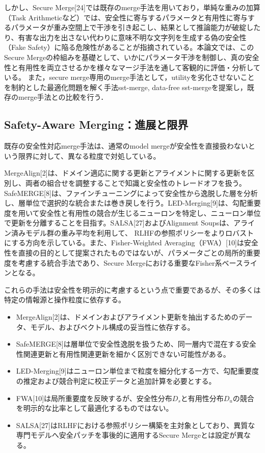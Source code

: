 しかし、Secure Merge[24]では既存のmerge手法を用いており，単純な重みの加算（Task Arithmeticなど）では、安全性に寄与するパラメータと有用性に寄与するパラメータが重み空間上で干渉を引き起こし、結果として推論能力が破綻したり、有害な出力を出さない代わりに意味不明な文字列を生成する偽の安全性（Fake Safety）に陥る危険性があることが指摘されている。本論文では、このSecure Mergeの枠組みを基礎として、いかにパラメータ干渉を制御し、真の安全性と有用性を両立させるかを様々なマージ手法を通して客観的に評価・分析している。
また，secure merge専用のmerge手法として，utilityを劣化させないことを制約とした最適化問題を解く手法sst-merge, data-free sst-mergeを提案し，既存のmerge手法との比較を行う．

\subsection{Safety-Aware Merging：進展と限界}
\label{app:safety-aware-merging}

既存の安全性対応merge手法は、通常のmodel mergeが安全性を直接扱わないという限界に対して、異なる粒度で対処している。

MergeAlign[2]は、ドメイン適応に関する更新とアライメントに関する更新を区別し、両者の組合せを調整することで知識と安全性のトレードオフを扱う。SafeMERGE[8]は、ファインチューニングによって安全性から逸脱した層を分析し、層単位で選択的な統合または巻き戻しを行う。LED-Merging[9]は、勾配重要度を用いて安全性と有用性の競合が生じるニューロンを特定し、ニューロン単位で更新を分離することを目指す。SALSA[27]およびAlignment Soupsは、アライン済みモデル群の重み平均を利用して、
RLHFの参照ポリシーをよりロバストにする方向を示している。また、Fisher-Weighted Averaging（FWA）[10]は安全性を直接の目的として提案されたものではないが、パラメータごとの局所的重要度を考慮する統合手法であり、Secure Mergeにおける重要なFisher系ベースラインとなる。

これらの手法は安全性を明示的に考慮するという点で重要であるが、その多くは特定の情報源と操作粒度に依存する。

\begin{itemize}
\item MergeAlign[2]は、ドメインおよびアライメント更新を抽出するためのデータ、モデル、およびベクトル構成の妥当性に依存する。
\item SafeMERGE[8]は層単位で安全性逸脱を扱うため、同一層内で混在する安全性関連更新と有用性関連更新を細かく区別できない可能性がある。
\item LED-Merging[9]はニューロン単位まで粒度を細分化する一方で、勾配重要度の推定および競合判定に校正データと追加計算を必要とする。
\item FWA[10]は局所重要度を反映するが、安全性分布\(D_s\)と有用性分布\(D_u\)の競合を明示的な比率として最適化するものではない。
\item SALSA[27]はRLHFにおける参照ポリシー構築を主対象としており、異質な専門モデルへ安全パッチを事後的に適用するSecure Mergeとは設定が異なる。
\end{itemize}

